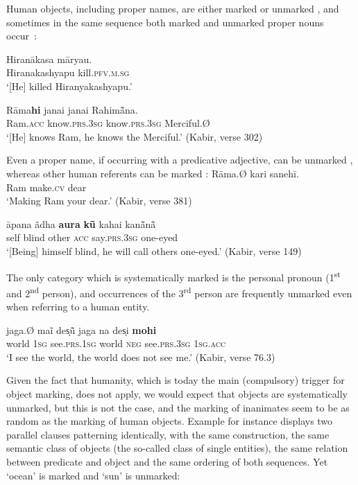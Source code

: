 \documentclass[output=paper]{LSP/langsci}
\begin{document}
Human objects, including proper names, are either marked  or unmarked , and sometimes in the same sequence both marked and unmarked proper nouns occur~:

\ea 
\label{10-mo-ex:28}
\ea  \label{10-mo-ex:28a}
\gll Hiranākasa māryau.\\
 Hiranakashyapu kill.\textsc{pfv.m.sg}\\
\glt ‘[He] killed Hiranyakashyapu.’ 

\ex \label{10-mo-ex:28b}
\gll Rāma\textbf{hi} janai janai Rahimā̃na.\\
 Ram.\textsc{acc} know.\textsc{prs.3sg} know.\textsc{prs.3sg} Merciful.Ø\\
\glt ‘[He] knows Ram, he knows the Merciful.’ (Kabir, verse 302)
\z
\z

Even a proper name, if occurring with a predicative adjective, can be unmarked , whereas other human referents can be marked :
\ea
\label{10-mo-ex:29}
\ea \label{10-mo-ex:29a}
\gll Rāma.Ø kari sanehī.\\
 Ram make.\textsc{cv} dear\\
\glt ‘Making Ram your dear.’ (Kabir, verse  381)

\ex \label{10-mo-ex:29b}
\gll āpana ãdha \textbf{aura} \textbf{kū̃} kahai kanā̃nā̃\\
 self blind other \textsc{acc} say.\textsc{prs.3sg} one-eyed\\
\glt ‘[Being] himself blind, he will call others one-eyed.’ (Kabir, verse 149)
\z
\z

The only category which is systematically marked is the personal pronoun (1\textsuperscript{st} and 2\textsuperscript{nd} person), and occurrences of the 3\textsuperscript{rd} person are frequently unmarked even when referring to a human entity. 

\ea
\label{10-mo-ex:30}
\gll  jaga.Ø maĩ des̩ū̃	 jaga na des̩i \textbf{mohi}\\
 world \textsc{1sg} see.\textsc{prs.1sg} world \textsc{neg} see.\textsc{prs.3sg} \textsc{1sg.acc}\\
\glt ‘I see the world, the world does not see me.’ (Kabir, verse 76.3)
\z

Given the fact that humanity, which is today the main (compulsory) trigger for object marking, does not apply, we would expect that  objects are systematically unmarked, but this is not the case, and the marking of inanimates seem to be as random as the marking of human objects. Example  for instance displays two parallel clauses patterning identically, with the same construction, the same semantic class of objects (the so-called class of single entities), the same relation between predicate and object and the same ordering of both sequences. Yet ‘ocean’ is marked and ‘sun’ is unmarked:
\end{document}
